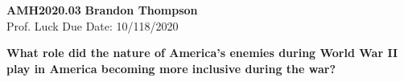 \noindent
\textbf{AMH2020.03} \hfill \textbf{Brandon Thompson} \\
\normalsize Prof. Luck \hfill Due Date: 10/118/2020 \\

\begin{center}
\textbf{What role did the nature of America's enemies during World War II play in America becoming more inclusive during the war?}
\end{center}